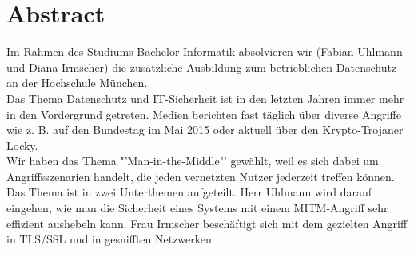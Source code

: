 \section*{Abstract}
Im Rahmen des Studiums Bachelor Informatik absolvieren wir (Fabian Uhlmann und Diana Irmscher) die zusätzliche Ausbildung zum betrieblichen Datenschutz an der Hochschule München.
\\
Das Thema Datenschutz und IT-Sicherheit ist in den letzten Jahren immer mehr in den Vordergrund getreten. Medien berichten fast täglich über diverse Angriffe wie z. B. auf den Bundestag im Mai 2015 oder aktuell über den Krypto-Trojaner Locky.
\\	
Wir haben das Thema "'Man-in-the-Middle"' gewählt, weil es sich dabei um Angriffsszenarien handelt, die jeden vernetzten Nutzer jederzeit treffen können.
\\	
Das Thema ist in zwei Unterthemen aufgeteilt.
Herr Uhlmann wird darauf eingehen, wie man die Sicherheit eines Systems mit einem MITM-Angriff sehr effizient aushebeln kann.
Frau Irmscher beschäftigt sich mit dem gezielten Angriff in TLS/SSL und in gesnifften Netzwerken.
{}
		 
